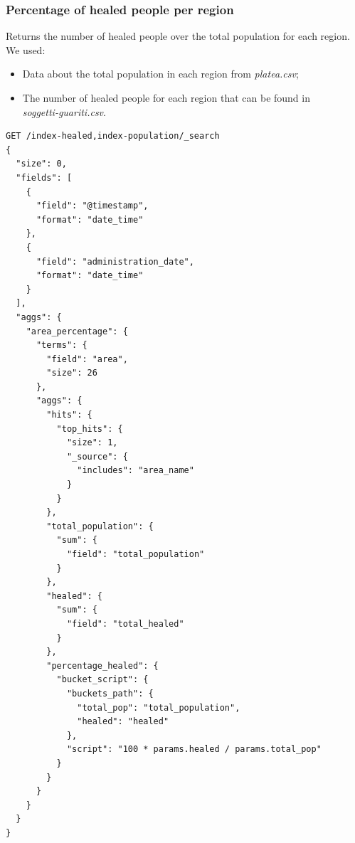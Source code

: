 \documentclass[12pt, a4paper]{article}
\begin{document}
\subsubsection{Percentage of healed people per region}
Returns the number of healed people over the total population for each region. \\
We used:
\begin{itemize}
  \item Data about the total population in each region from \emph{platea.csv};
  \item The number of healed people for each region that can be found in \\
    \emph{soggetti-guariti.csv}.
\end{itemize}
\begin{tcolorbox}[fontupper=\scriptsize]
  \begin{verbatim}
GET /index-healed,index-population/_search 
{
  "size": 0,
  "fields": [
    {
      "field": "@timestamp",
      "format": "date_time"
    },
    {
      "field": "administration_date",
      "format": "date_time"
    }
  ],
  "aggs": {
    "area_percentage": {
      "terms": {
        "field": "area",
        "size": 26
      },
      "aggs": {
        "hits": {
          "top_hits": {
            "size": 1,
            "_source": {
              "includes": "area_name"
            }
          }
        },
        "total_population": {
          "sum": {
            "field": "total_population"
          }
        },
        "healed": {
          "sum": {
            "field": "total_healed"
          }
        },
        "percentage_healed": { 
          "bucket_script": {
            "buckets_path": {
              "total_pop": "total_population",
              "healed": "healed"
            },
            "script": "100 * params.healed / params.total_pop"
          }
        }
      }
    }
  }
}
  \end{verbatim}
\end{tcolorbox}
\end{document}
